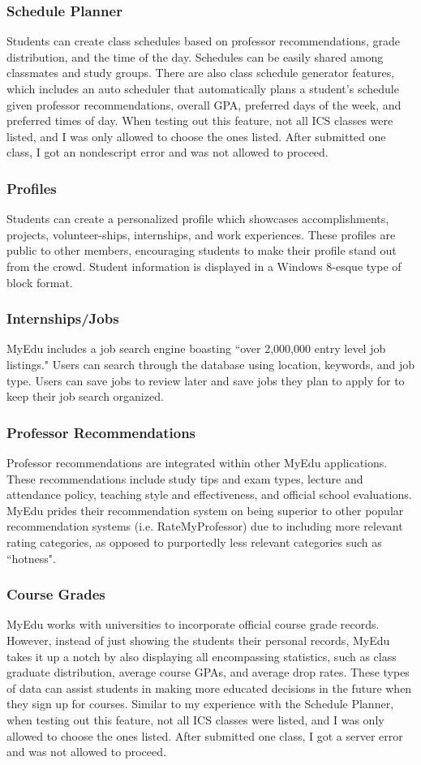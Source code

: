\subsubsection{Schedule Planner}
Students can create class schedules based on professor recommendations, grade distribution, and the time of the day. Schedules can be easily shared among classmates and study groups. There are also class schedule generator features, which includes an auto scheduler that automatically plans a student's schedule given professor recommendations, overall GPA, preferred days of the week, and preferred times of day.  When testing out this feature, not all ICS classes were listed, and I was only allowed to choose the ones listed. After submitted one class, I got an nondescript error and was not allowed to proceed.
\subsubsection{Profiles}
Students can create a personalized profile which showcases accomplishments, projects, volunteer-ships, internships, and work experiences. These profiles are public to other members, encouraging students to make their profile stand out from the crowd. Student information is displayed in a Windows 8-esque type of block format. 
\subsubsection{Internships/Jobs}
MyEdu includes a job search engine boasting ``over 2,000,000 entry level job listings." Users can search through the database using location, keywords, and job type. Users can save jobs to review later and save jobs they plan to apply for to keep their job search organized. 
\subsubsection{Professor Recommendations}
Professor recommendations are integrated within other MyEdu applications. These recommendations include study tips and exam types, lecture and attendance policy, teaching style and effectiveness, and official school evaluations. MyEdu prides their recommendation system on being superior to other popular recommendation systems (i.e. RateMyProfessor) due to including more relevant rating categories, as opposed to purportedly less relevant categories such as ``hotness". 
\subsubsection{Course Grades}
MyEdu works with universities to incorporate official course grade records. However, instead of just showing the students their personal records, MyEdu takes it up a notch by also displaying all encompassing statistics, such as class graduate distribution, average course GPAs, and average drop rates. These types of data can assist students in making more educated decisions in the future when they sign up for courses. Similar to my experience with the Schedule Planner, when testing out this feature, not all ICS classes were listed, and I was only allowed to choose the ones listed. After submitted one class, I got a server error and was not allowed to proceed. 
